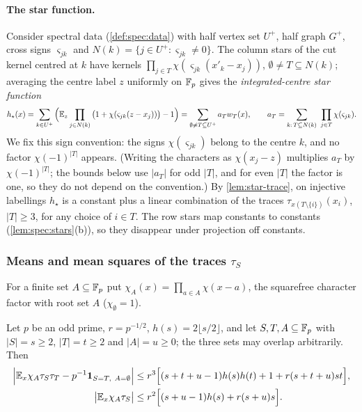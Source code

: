 \paragraph{The star function.} Consider spectral data (\cref{def:spec:data})
with half vertex set $U^+$, half graph $G^+$, cross signs $\varsigma_{jk}$ and
$N(k)=\{j\in U^+:\varsigma_{jk}\ne0\}$. The column stars of the cut kernel
centred at $k$ have kernels $\prod_{j\in T}\chi(\varsigma_{jk}(x'_k-x_j))$,
$\emptyset\ne T\subseteq N(k)$; averaging the centre label $z$ uniformly on $\mathbb F_p$ gives the \emph{integrated-centre star function}
\begin{equation}\label{eq:star-function}
  h_\star(x)=\sum_{k\in U^+}\Big(\mathbb E_z\prod_{j\in N(k)}\big(1+\chi(\varsigma_{jk}(z-x_j))\big)-1\Big)
  =\sum_{\emptyset\ne T\subseteq U^+}a_Tw_T(x),\qquad
  a_T=\sum_{k:\,T\subseteq N(k)}\ \prod_{j\in T}\chi(\varsigma_{jk}).
\end{equation}
We fix this sign convention: the signs $\chi(\varsigma_{jk})$ belong to the
centre $k$, and no factor $\chi(-1)^{|T|}$ appears. (Writing the characters as
$\chi(x_j-z)$ multiplies $a_T$ by $\chi(-1)^{|T|}$; the bounds below use $|a_T|$
for odd $|T|$, and for even $|T|$ the factor is one, so they do not depend on
the convention.) By \cref{lem:star-trace}, on injective labellings $h_\star$ is a
constant plus a linear combination of the traces
$\tau_{x(T\setminus\{i\})}(x_i)$, $|T|\ge3$, for any choice of $i\in T$. The
row stars map constants to constants
(\cref{lem:spec:stars}(b)), so they disappear under projection off constants.

\subsubsection{Means and mean squares of the traces \texorpdfstring{$\tau_S$}{tau\_S}}\label{subsec:moving-root-moments}

For a finite set $A\subseteq\mathbb F_p$ put $\chi_A(x)=\prod_{a\in A}\chi(x-a)$, the
squarefree character factor with root set $A$ ($\chi_\emptyset=1$).

\begin{lemma}\label{lem:moving-root-moments}
Let $p$ be an odd prime, $r=p^{-1/2}$, $h(s)=2\lfloor s/2\rfloor$, and let
$S,T,A\subseteq\mathbb F_p$ with $|S|=s\ge2$, $|T|=t\ge2$ and $|A|=u\ge0$; the three
sets may overlap arbitrarily. Then
\begin{align}
 \Big|\mathbb E_x\chi_A\tau_S\tau_T-p^{-1}\mathbf 1_{S=T,\ A=\emptyset}\Big|
 &\le r^3\Big[(s+t+u-1)h(s)h(t)+1+r(s+t+u)st\Big],
 \label{eq:advance:rank-second}\\
 \big|\mathbb E_x\chi_A\tau_S\big|
 &\le r^2\Big[(s+u-1)h(s)+r(s+u)s\Big].
 \label{eq:advance:rank-first}
\end{align}
\end{lemma}

